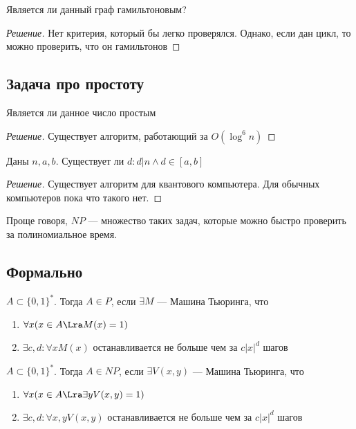 \begin{problem}
    Является ли данный граф гамильтоновым?
\end{problem}
\begin{proof}[Решение]
    Нет критерия, который бы легко проверялся. Однако, если дан цикл, то можно проверить, что он гамильтонов
\end{proof}


\subsection{Задача про простоту}


\begin{problem}
    Является ли данное число простым
\end{problem}
\begin{proof}[Решение]
    Существует алгоритм, работающий за \(O(\log^6 n)\)
\end{proof}

\begin{problem}
    Даны \(n, a, b\). Существует ли \(d: d|n \wedge d \in [a, b]\)
\end{problem}
\begin{proof}[Решение]
    Существует алгоритм для квантового компьютера. Для обычных компьютеров пока что такого нет.
\end{proof}

Проще говоря, \(NP\) --- множество таких задач, которые можно быстро проверить за полиномиальное время.

\subsection{Формально}

\begin{definition}
    \(A \subset \{0, 1\}^*\). Тогда \(A \in P\), если \(\exists M\) --- Машина Тьюринга, что
    \begin{enumerate}
        \item \(\forall x (x \in A \Lra M(x) = 1)\)
        \item \(\exists c, d: \forall x M(x)\) останавливается не больше чем за \(c|x|^d\) шагов
    \end{enumerate}
\end{definition}

\begin{definition}
    \(A \subset \{0, 1\}^*\). Тогда \(A \in NP\), если \(\exists V(x, y)\) --- Машина Тьюринга, что
    \begin{enumerate}
        \item \(\forall x (x \in A \Lra \exists y V(x, y) = 1)\)
        \item \(\exists c, d: \forall x, y V(x, y)\) останавливается не больше чем за \(c|x|^d\) шагов
    \end{enumerate}
\end{definition}

